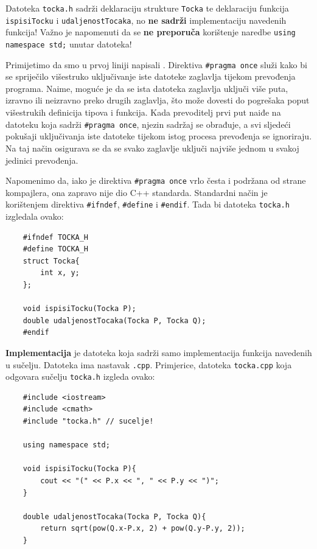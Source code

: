 Datoteka \texttt{tocka.h} sadrži deklaraciju strukture \texttt{Tocka} te deklaraciju funkcija \texttt{ispisiTocku} i \texttt{udaljenostTocaka}, no \textbf{ne sadrži} implementaciju navedenih funkcija!
Važno je napomenuti da se \textbf{ne preporuča} korištenje naredbe \texttt{using namespace std;} unutar  datoteka!
\medskip

Primijetimo da smo u prvoj liniji napisali . 
Direktiva \texttt{\#pragma once} služi kako bi se spriječilo višestruko uključivanje iste datoteke zaglavlja tijekom prevođenja programa. Naime, moguće je da se ista datoteka zaglavlja uključi više puta, izravno ili neizravno preko drugih zaglavlja, što može dovesti do pogrešaka poput višestrukih definicija tipova i funkcija. Kada prevoditelj prvi put naiđe na datoteku koja sadrži \texttt{\#pragma once}, njezin sadržaj se obrađuje, a svi sljedeći pokušaji uključivanja iste datoteke tijekom istog procesa prevođenja se ignoriraju. Na taj način osigurava se da se svako zaglavlje uključi najviše jednom u svakoj jedinici prevođenja.

Napomenimo da, iako je direktiva \texttt{\#pragma once} vrlo česta i podržana od strane kompajlera, ona zapravo nije dio C++ standarda. Standardni način je korištenjem direktiva \texttt{\#ifndef}, \texttt{\#define} i \texttt{\#endif}. Tada bi datoteka \texttt{tocka.h} izgledala ovako:

\begin{verbatim}
    #ifndef TOCKA_H
    #define TOCKA_H
    struct Tocka{
        int x, y;
    };

    void ispisiTocku(Tocka P);
    double udaljenostTocaka(Tocka P, Tocka Q);
    #endif
\end{verbatim}



\medskip

\textbf{Implementacija} je datoteka koja sadrži samo implementacija funkcija navedenih u sučelju. Datoteka ima nastavak \texttt{.cpp}. Primjerice, datoteka \texttt{tocka.cpp} koja odgovara sučelju \texttt{tocka.h} izgleda ovako:
\begin{verbatim}
    #include <iostream>
    #include <cmath>
    #include "tocka.h" // sucelje!

    using namespace std;

    void ispisiTocku(Tocka P){
        cout << "(" << P.x << ", " << P.y << ")";
    }

    double udaljenostTocaka(Tocka P, Tocka Q){
        return sqrt(pow(Q.x-P.x, 2) + pow(Q.y-P.y, 2)); 
    }
\end{verbatim}

